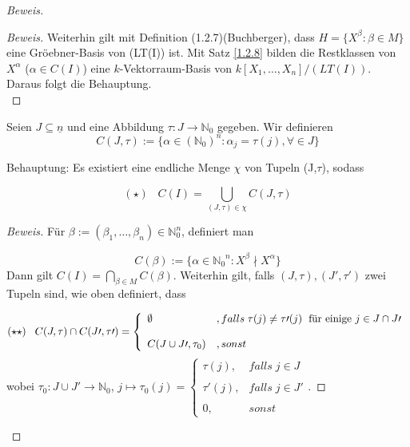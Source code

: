 \documentclass{article}
\newcommand*{\R}{k[X_{1},\ldots,X_{n}]}
\newcommand*{\indx}[2]{{#1}_{#2}}
\newcommand*{\potx}[2]{{#1}^{#2}}
\newcommand*{\N}{\mathbb{N}_0}
\begin{document}
\begin{proof}[Beweis]
\begin{compactenum}
\begin{proof}[Beweis]
			Weiterhin gilt mit Definition (1.2.7)(Buchberger), dass $H=\{\potx{X}{\beta}:\beta \in M \}$ eine Gröebner-Basis von (LT(I)) ist. Mit Satz \ref{1.2.8} bilden die Restklassen von $\potx{X}{\alpha}$ ($\alpha\in C(I)$) eine $k$-Vektorraum-Basis von $\R/(LT(I))$. Daraus folgt die Behauptung.\\
		\end{proof}
		\item Seien $J\subseteq \underline{n}$ und eine Abbildung $\tau:J\longrightarrow \N$ gegeben. Wir definieren
		\begin{displaymath}
		C(J,\tau):=\{\alpha \in (\N)^n: \indx{\alpha}{j}=\tau(j), \forall \in J  \}
		\end{displaymath}
		
		Behauptung: Es existiert eine endliche Menge $\chi$ von Tupeln (J,$\tau$), sodass 
		
		\begin{displaymath}
		(\star)\;\;\;   C(I)=\bigcup\limits_{(J,\tau)\in \chi} C(J,\tau)  
		\end{displaymath}
		
		\begin{proof}[Beweis]
			Für $\beta:=(\indx{\beta}{1},\ldots,\indx{\beta}{n}) \in \N^n$, definiert man 
			
			\begin{displaymath}
			C(\beta):=\{\alpha\in \potx{\N}{n}: \potx{X}{\beta}\nmid\potx{X}{\alpha}\}
			\end{displaymath}
			Dann gilt $C(I)=\bigcap\limits_{\beta\in M}C(\beta)$. 
			Weiterhin gilt, falls $(J,\tau),(J\prime,\tau\prime)$ zwei Tupeln sind, wie oben definiert, dass
			
			\begin{displaymath}
			(\star \star)\;\;\;   C(J,\tau)\cap C(J\prime,\tau\prime)=\left\{\begin{array}{ll} \emptyset & ,falls  \;\tau(j)\neq\tau\prime(j)\; \textnormal{ für einige } j\in J\cap J\prime \\
			\\
			C(J\cup J\prime, \tau_0) & ,sonst \end{array}\right.
			\end{displaymath} 
			wobei $\indx{\tau}{0}:J\cup J\prime \longrightarrow \N$, $ j\mapsto \tau_{0}(j)=\left\{\begin{array}{ll} \tau(j), & falls\;  j \in J \\
			\\
			\tau\prime(j), & falls\;  j \in J\prime \\
			\\
			0, & sonst \end{array}\right.$.
			

\end{proof}
\end{compactenum}
\end{proof}
\end{document}

